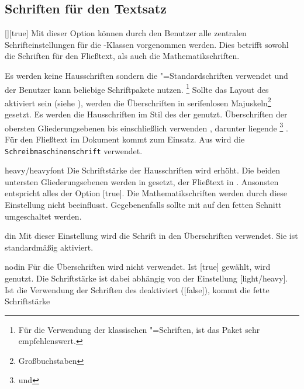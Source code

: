 \documentclass[%
  english,ngerman,%
  headings=optiontoheadandtoc,captions=tableheading,numbers=noenddot,%
  chapterpage,cdfoot,%
]{tudscrman}
\begin{document}
\subsection{Schriften für den Textsatz}\label{sec:text}
%
\begin{Declaration}{[\PSet]}[true]%
\printdeclarationlist%
%
%
Mit dieser Option können durch den Benutzer alle zentralen Schrifteinstellungen 
für die \TUDScript-Klassen vorgenommen werden. Dies betrifft sowohl die 
Schriften für den Fließtext, als auch die Mathematikschriften.
%
\begin{values}
\itemfalse
  Es werden keine Hausschriften sondern die "=Standardschriften 
  verwendet und der Benutzer kann beliebige Schriftpakete nutzen.%
  \footnote{%
    Für die Verwendung der klassischen "=Schriften, ist das Paket 
     sehr empfehlenswert.%
  }
  Sollte das Layout des \CDs aktiviert sein (siehe ), werden die 
  Überschriften in serifenlosen Majuskeln\footnote{Großbuchstaben} gesetzt.
   Es werden die Hausschriften im Stil des \CDs der \TnUD genutzt. 
   Überschriften der obersten Gliederungsebenen bis einschließlich 
    verwenden \DIN, darunter liegende%
   \footnote{ und } 
   . Für den Fließtext im Dokument kommt 
    zum Einsatz. Aus  wird die
   \texttt{Schreibmaschinenschrift} verwendet.
\item[heavy/heavyfont]
  Die Schriftstärke der Hausschriften wird erhöht. Die beiden untersten 
  Gliederungsebenen werden in  gesetzt, der Fließtext 
  in . Ansonsten entspricht alles der Option 
  [true]. Die Mathematikschriften werden durch diese Einstellung 
  nicht beeinflusst. Gegebenenfalls sollte mit  auf den fetten 
  Schnitt umgeschaltet werden.
\item[din]
  Mit dieser Einstellung wird die Schrift \DIN in den Überschriften verwendet. 
  Sie ist standardmäßig aktiviert.
\item[nodin]
  Für die Überschriften wird nicht \DIN verwendet. Ist [true] 
  gewählt, wird \Univers genutzt. Die Schriftstärke ist dabei abhängig von der 
  Einstellung [light/heavy]. Ist die Verwendung der Schriften 
  des \CDs deaktiviert ([false]), kommt die fette Schriftstärke 

\end{values}
\end{Declaration}
\end{document}
